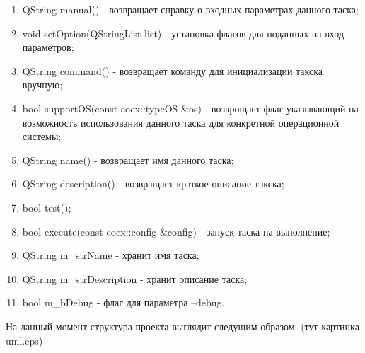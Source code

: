 \begin{enumerate}
\item QString manual() - возвращает справку о входных параметрах данного таска;
\item void setOption(QStringList list) - установка флагов для поданных на вход параметров;
\item QString command() - возвращает команду для инициализации такска вручную;
\item bool supportOS(const coex::typeOS &os) - возврощает флаг указывающий на возможность использования данного таска для конкретной операционной системы;
\item QString name() - возвращает имя данного таска;
\item QString description() - возвращает краткое описание такска;
\item bool test();
\item bool execute(const coex::config &config) - запуск таска на выполнение;
\item QString m\_strName - хранит имя таска;
\item QString m\_strDescription - хранит описание таска;
\item bool m\_bDebug - флаг для параметра --debug.
\end{enumerate}

На данный момент структура проекта выглядит следущим образом:
(тут картинка uml.eps)